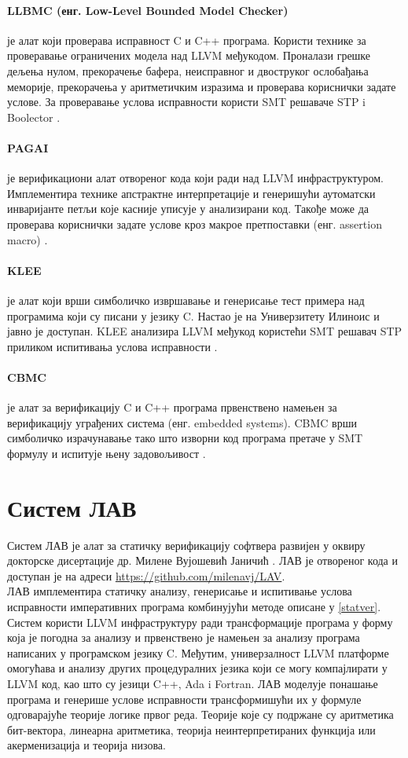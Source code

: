 \documentclass[12pt,oneside]{memoir}
\begin{document}
\paragraph{ LLBMC (енг. Low-Level Bounded Model Checker)} је алат који проверава исправност 
C и C++ програма. Користи технике за проверавање ограничених модела над LLVM међукодом. Проналази грешке дељења нулом, прекорачење бафера, неисправног и двоструког ослобађања меморије, прекорачења у аритметичким изразима и проверава кориснички задате услове. За проверавање услова исправности користи SMT решаваче STP i Boolector \cite{llbmc}.

\paragraph{PAGAI} је верификациони алат отвореног кода који ради над LLVM инфраструктуром. Имплементира технике апстрактне интерпретације и  генеришући аутоматски инваријанте петљи које касније уписује у анализирани код.  Такође може да проверава кориснички задате услове кроз макрое претпоставки (енг. assertion macro) \cite{pagai}.

\paragraph{KLEE} је алат који врши симболичко извршавање и генерисање тест примера над програмима који су писани у језику C. Настао је на Универзитету Илиноис и јавно је доступан. KLEE анализира LLVM међукод користећи SMT решавач STP приликом испитивања услова исправности \cite{klee}. 

\paragraph{CBMC} је алат за верификацију C и C++ програма првенствено намењен за верификацију уграђених система (енг. embedded systems). CBMC врши симболичко израчунавање тако што изворни код програма претаче у SMT формулу и испитује њену задовољивост \cite{cbmc}. 

  \section{Систем ЛАВ}
	Систем ЛАВ је алат за статичку верификацију софтвера развијен у оквиру докторске дисертације др. Милене Вујошевић Јаничић \cite{mvjphd}. ЛАВ је отвореног кода и доступан је на адреси \url{https://github.com/milenavj/LAV}. 
  \\
	ЛАВ имплементира статичку анализу, генерисање и испитивање услова исправности императивних програма комбинујући методе описане у \ref{statver}. Систем користи LLVM инфраструктуру ради трансформације програма у форму која је погодна за анализу и првенствено је намењен за анализу програма написаних у програмском језику C. Међутим, универзалност LLVM платформе омогућава и анализу других процедуралних језика који се могу компајлирати у LLVM код, као што су језици C++, Ada i Fortran. ЛАВ моделује понашање програма и генерише услове исправности трансформишући их у формуле одговарајуће теорије логике првог реда. Теорије које су подржане су аритметика бит-вектора, линеарна аритметика, теорија неинтерпретираних функција или акерменизација и теорија низова.   
\end{document}
